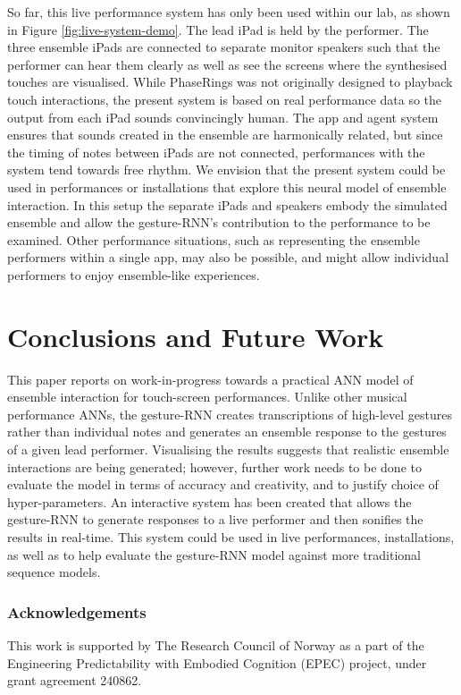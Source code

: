 \documentclass[sigchi]{acmart} %
\begin{document}
So far, this live performance system has only been used within our lab,
as shown in Figure \ref{fig:live-system-demo}. The lead iPad is held
by the performer. The three ensemble iPads are connected to separate
monitor speakers such that the performer can hear them clearly as well
as see the screens where the synthesised touches are visualised. While
PhaseRings was not originally designed to playback touch interactions,
the present system is based on real performance data so the output
from each iPad sounds convincingly human. The app and agent system
ensures that sounds created in the ensemble are harmonically related,
but since the timing of notes between iPads are not connected,
performances with the system tend towards free rhythm. We envision
that the present system could be used in performances or installations
that explore this neural model of ensemble interaction. In this setup
the separate iPads and speakers embody the simulated ensemble and
allow the gesture-RNN's contribution to the performance to be
examined. Other performance situations, such as representing the
ensemble performers within a single app, may also be possible, and
might allow individual performers to enjoy ensemble-like experiences.

\section{Conclusions and Future Work}

This paper reports on work-in-progress towards a practical ANN model
of ensemble interaction for touch-screen performances. Unlike other
musical performance ANNs, the gesture-RNN creates transcriptions of
high-level gestures rather than individual notes and generates an
ensemble response to the gestures of a given lead performer.
Visualising the results suggests that realistic ensemble interactions
are being generated; however, further work needs to be done to
evaluate the model in terms of accuracy and creativity, and to justify
choice of hyper-parameters. An interactive system has been created
that allows the gesture-RNN to generate responses to a live performer
and then sonifies the results in real-time. This system could be used
in live performances, installations, as well as to help evaluate the
gesture-RNN model against more traditional sequence models.

\subsubsection*{Acknowledgements}
This work is supported by The Research Council of Norway as
a part of the Engineering Predictability with Embodied Cognition
(EPEC) project, under grant agreement 240862.



\end{document}
